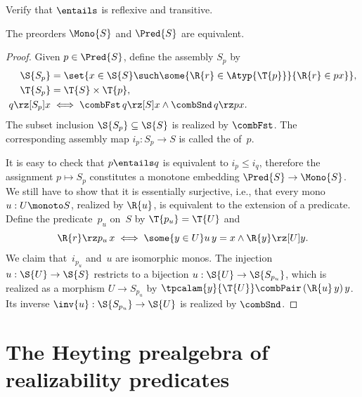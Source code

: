 \begin{exercise}
  Verify that $\entails$ is reflexive and transitive.
\end{exercise}

\begin{theorem}
  \label{thm:mono-equiv-pred}%
  The preorders $\Mono{S}$ and $\Pred{S}$ are equivalent.
\end{theorem}

\begin{proof}
  Given $p \in \Pred{S}$, define the assembly $S_p$ by
  \begin{align*}
    \S{S_p} &= \set{x \in \S{S} \such \some{\R{r} \in \Atyp{\T{p}}}{\R{r} \in p x}}, \\
    \T{S_p} &= \T{S} \times \T{p}, \\
    q \rz[S_p] x &\iff \combFst \, q \rz[S] x \land \combSnd\,q \rz p x.
  \end{align*}
  The subset inclusion $\S{S_p} \subseteq \S{S}$ is realized by $\combFst$.
  The corresponding assembly map $i_p : S_p \to S$ is called the  of~$p$.

  It is easy to check that $p \entails q$ is equivalent to $i_p \leq i_q$, therefore the assignment $p \mapsto S_p$ constitutes a monotone embedding $\Pred{S} \to \Mono{S}$.
  We still have to show that it is essentially surjective, i.e., that every mono
  $u : U \monoto S$, realized by $\R{u}$, is equivalent to the extension of a predicate.
  Define the predicate~$p_u$ on~$S$ by $\T{p_u} = \T{U}$ and
  \begin{equation*}
    \R{r} \rz p_u \, x
    \iff
    \some{y \in U} u\,y = x \land \R{y} \rz[U] y.
  \end{equation*}
  We claim that~$i_{p_u}$ and~$u$ are isomorphic monos.
  The injection $u : \S{U} \to \S{S}$ restricts to a
  bijection $u : \S{U} \to \S{S_{p_u}}$, which is realized as a morphism $U \to
  S_{p_u}$ by
  $\tpcalam{y}{\T{U}} \combPair\,(\R{u}\,y)\,y$. Its inverse
  $\inv{u} : \S{S_{p_u}} \to \S{U}$ is realized by $\combSnd$.
\end{proof}


\section{The Heyting prealgebra of realizability predicates}
\label{sec:heyting-prealgebra}

